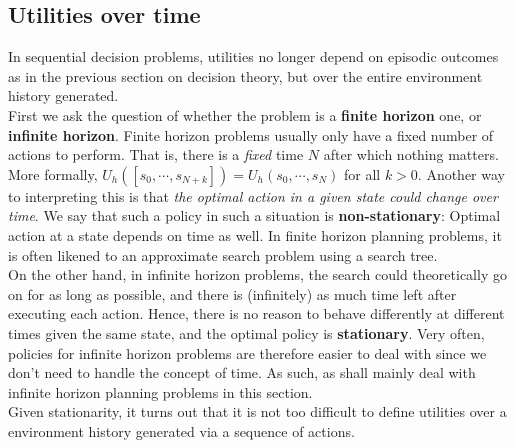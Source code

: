 \documentclass[11pt]{article}
\begin{document}
\subsection{Utilities over time}

In sequential decision problems, utilities no longer depend on episodic outcomes as in the previous section on decision theory, but over the entire environment history generated. \\

First we ask the question of whether the problem is a \textbf{finite horizon} one, or \textbf{infinite horizon}. Finite horizon problems usually only have a fixed number of actions to perform. That is, there is a \textit{fixed} time $N$ after which nothing matters. More formally, $U_h([s_0, \cdots, s_{N+k}]) = U_h(s_0, \cdots, s_{N})$ for all $k > 0$. Another way to interpreting this is that \textit{the optimal action in a given state could change over time}. We say that such a policy in such a situation is \textbf{non-stationary}: Optimal action at a state depends on time as well. In finite horizon planning problems, it is often likened to an approximate search problem using a search tree.\\

On the other hand, in infinite horizon problems, the search could theoretically go on for as long as possible, and there is (infinitely) as much time left after executing each action. Hence, there is no reason to behave differently at different times given the same state, and the optimal policy is \textbf{stationary}. Very often, policies for infinite horizon problems are therefore easier to deal with since we don't need to handle the concept of time. As such, as shall mainly deal with infinite horizon planning problems in this section.\\

Given stationarity, it turns out that it is not too difficult to define utilities over a environment history generated via a sequence of actions.
\end{document}
